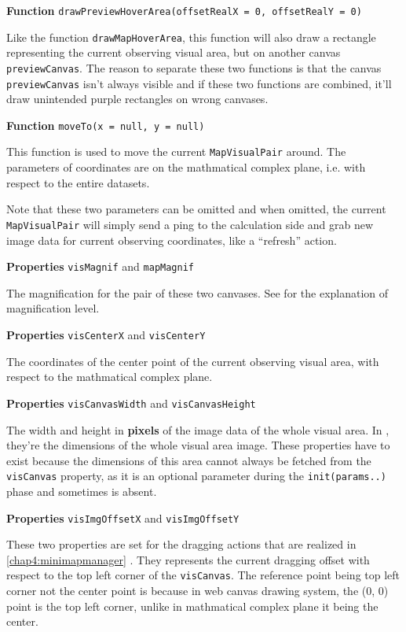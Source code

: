\textbf{Function} \verb|drawPreviewHoverArea(offsetRealX = 0, offsetRealY = 0)|

Like the function \texttt{drawMapHoverArea}, this function will also draw a rectangle representing the current observing visual area, but on another canvas \texttt{previewCanvas}. The reason to separate these two functions is that the canvas \texttt{previewCanvas} isn't always visible and if these two functions are combined, it'll draw unintended purple rectangles on wrong canvases.

\textbf{Function} \verb|moveTo(x = null, y = null)|

This function is used to move the current \texttt{MapVisualPair} around. The parameters of coordinates are on the mathmatical complex plane, i.e. with respect to the entire datasets.

Note that these two parameters can be omitted and when omitted, the current \texttt{MapVisualPair} will simply send a ping to the calculation side and grab new image data for current observing coordinates, like a ``refresh'' action.

\textbf{Properties} \texttt{visMagnif} and \texttt{mapMagnif}

The magnification for the pair of these two canvases. See  for the explanation of magnification level.

\textbf{Properties} \texttt{visCenterX} and \texttt{visCenterY}

The coordinates of the center point of the current observing visual area, with respect to the mathmatical complex plane.

\textbf{Properties} \texttt{visCanvasWidth} and \texttt{visCanvasHeight}

The width and height in \textbf{pixels} of the image data of the whole visual area. In , they're the dimensions of the whole visual area image. These properties have to exist because the dimensions of this area cannot always be fetched from the \texttt{visCanvas} property, as it is an optional parameter during the \texttt{init(params..)} phase and sometimes is absent.

\textbf{Properties} \texttt{visImgOffsetX} and \texttt{visImgOffsetY}

These two properties are set for the dragging actions that are realized in \ref{chap4:minimapmanager} . They represents the current dragging offset with respect to the top left corner of the \texttt{visCanvas}. The reference point being top left corner not the center point is because in web canvas drawing system, the (0, 0) point is the top left corner, unlike in mathmatical complex plane it being the center.

